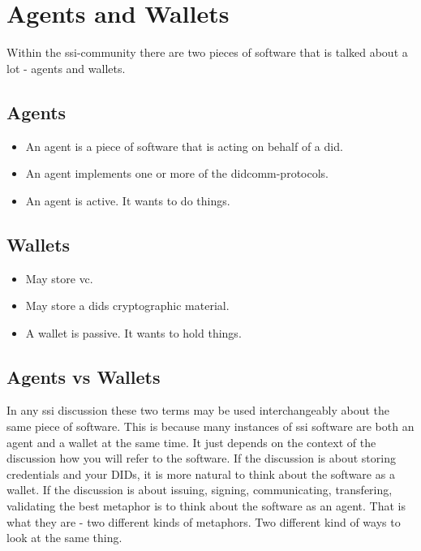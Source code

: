 \newpage



\section{Agents and Wallets}

Within the \acrshort{ssi}-community there are two pieces of software that is talked about a lot - agents and wallets.


\subsection{Agents}

\begin{itemize}
    \item An agent is a piece of software that is acting on behalf of a \acrshort{did}.
    \item An agent implements one or more of the \acrshort{didcomm}-protocols.
    \item An agent is active. It wants to do things.
\end{itemize}


\subsection{Wallets}

\begin{itemize}
    \item May store \acrfull{vc}.
    \item May store a \acrshort{did}s cryptographic material.
    \item A wallet is passive. It wants to hold things.
\end{itemize}

\subsection{Agents vs Wallets}

In any \acrshort{ssi} discussion these two terms may be used interchangeably about the same piece of software. This is because many instances of \acrshort{ssi} software are both an agent and a wallet at the same time. It just depends on the context of the discussion how you will refer to the software. If the discussion is about storing credentials and your DIDs, it is more natural to think about the software as a wallet. If the discussion is about issuing, signing, communicating, transfering, validating the best metaphor is to think about the software as an agent. That is what they are - two different kinds of metaphors. Two different kind of ways to look at the same thing.




